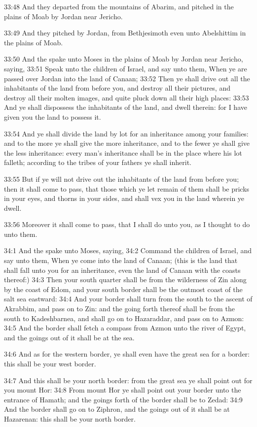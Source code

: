 33:48 And they departed from the mountains of Abarim, and pitched in
the plains of Moab by Jordan near Jericho.

33:49 And they pitched by Jordan, from Bethjesimoth even unto
Abelshittim in the plains of Moab.

33:50 And the \LORD spake unto Moses in the plains of Moab by Jordan
near Jericho, saying, 33:51 Speak unto the children of Israel, and say
unto them, When ye are passed over Jordan into the land of Canaan;
33:52 Then ye shall drive out all the inhabitants of the land from
before you, and destroy all their pictures, and destroy all their
molten images, and quite pluck down all their high places: 33:53 And
ye shall dispossess the inhabitants of the land, and dwell therein:
for I have given you the land to possess it.

33:54 And ye shall divide the land by lot for an inheritance among
your families: and to the more ye shall give the more inheritance, and
to the fewer ye shall give the less inheritance: every man's
inheritance shall be in the place where his lot falleth; according to
the tribes of your fathers ye shall inherit.

33:55 But if ye will not drive out the inhabitants of the land from
before you; then it shall come to pass, that those which ye let remain
of them shall be pricks in your eyes, and thorns in your sides, and
shall vex you in the land wherein ye dwell.

33:56 Moreover it shall come to pass, that I shall do unto you, as I
thought to do unto them.

34:1 And the \LORD spake unto Moses, saying, 34:2 Command the children
of Israel, and say unto them, When ye come into the land of Canaan;
(this is the land that shall fall unto you for an inheritance, even
the land of Canaan with the coasts thereof:) 34:3 Then your south
quarter shall be from the wilderness of Zin along by the coast of
Edom, and your south border shall be the outmost coast of the salt sea
eastward: 34:4 And your border shall turn from the south to the ascent
of Akrabbim, and pass on to Zin: and the going forth thereof shall be
from the south to Kadeshbarnea, and shall go on to Hazaraddar, and
pass on to Azmon: 34:5 And the border shall fetch a compass from Azmon
unto the river of Egypt, and the goings out of it shall be at the sea.

34:6 And as for the western border, ye shall even have the great sea
for a border: this shall be your west border.

34:7 And this shall be your north border: from the great sea ye shall
point out for you mount Hor: 34:8 From mount Hor ye shall point out
your border unto the entrance of Hamath; and the goings forth of the
border shall be to Zedad: 34:9 And the border shall go on to Ziphron,
and the goings out of it shall be at Hazarenan: this shall be your
north border.

